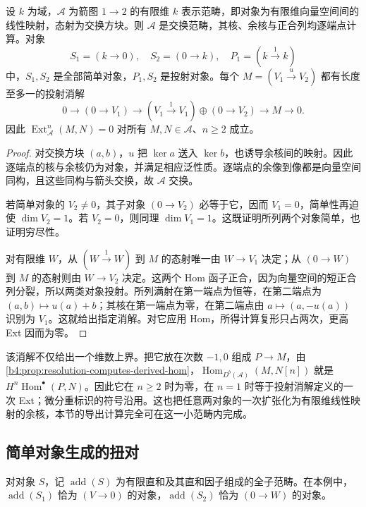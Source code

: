 \begin{proposition}\label{b4:prop:two-vertex-projective-resolution}
设 \(k\) 为域，\(\mathcal A\) 为箭图 \(1\to2\) 的有限维 \(k\) 表示范畴，即对象为有限维向量空间间的线性映射，态射为交换方块。则 \(\mathcal A\) 是交换范畴，其核、余核与正合列均逐端点计算。对象
\[
 S_1=(k\to0),\quad S_2=(0\to k),\quad P_1=(k\xrightarrow{1}k)
\]
中，\(S_1,S_2\) 是全部简单对象，\(P_1,S_2\) 是投射对象。每个 \(M=(V_1\xrightarrow{u}V_2)\) 都有长度至多一的投射消解
\[
 0\longrightarrow(0\to V_1)
 \longrightarrow(V_1\xrightarrow{1}V_1)\oplus(0\to V_2)
 \longrightarrow M\longrightarrow0.
\]
因此 \(\operatorname{Ext}_{\mathcal A}^n(M,N)=0\) 对所有 \(M,N\in\mathcal A\)、\(n\ge2\) 成立。
\end{proposition}
\begin{proof}
对交换方块 \((a,b)\)，\(u\) 把 \(\ker a\) 送入 \(\ker b\)，也诱导余核间的映射。因此逐端点的核与余核仍为对象，并满足相应泛性质。逐端点的余像到像都是向量空间同构，且这些同构与箭头交换，故 \(\mathcal A\) 交换。

若简单对象的 \(V_2\ne0\)，其子对象 \((0\to V_2)\) 必等于它，因而 \(V_1=0\)，简单性再迫使 \(\dim V_2=1\)。若 \(V_2=0\)，则同理 \(\dim V_1=1\)。这既证明所列两个对象简单，也证明穷尽性。

对有限维 \(W\)，从 \((W\xrightarrow{1}W)\) 到 \(M\) 的态射唯一由 \(W\to V_1\) 决定；从 \((0\to W)\) 到 \(M\) 的态射则由 \(W\to V_2\) 决定。这两个 Hom 函子正合，因为向量空间的短正合列分裂，所以两类对象投射。所列满射在第一端点为恒等，在第二端点为 \((a,b)\mapsto u(a)+b\)；其核在第一端点为零，在第二端点由 \(a\mapsto(a,-u(a))\) 识别为 \(V_1\)。这就给出指定消解。对它应用 Hom，所得计算复形只占两次，更高 Ext 因而为零。
\end{proof}

该消解不仅给出一个维数上界。把它放在次数 \(-1,0\) 组成 \(P\to M\)，由\cref{b4:prop:resolution-computes-derived-hom}，\(\operatorname{Hom}_{D^b(\mathcal A)}(M,N[n])\) 就是 \(H^n\operatorname{Hom}^{\bullet}(P,N)\)。因此它在 \(n\ge2\) 时为零，在 \(n=1\) 时等于投射消解定义的一次 Ext；微分重标识的符号沿用。这也把任意两对象的一次扩张化为有限维线性映射的余核，本节的导出计算完全可在这一小范畴内完成。

\subsection{简单对象生成的扭对}
\label{b4:subsec:1905:02}

对对象 \(S\)，记 \(\operatorname{add}(S)\) 为有限直和及其直和因子组成的全子范畴。在本例中，\(\operatorname{add}(S_1)\) 恰为 \((V\to0)\) 的对象，\(\operatorname{add}(S_2)\) 恰为 \((0\to W)\) 的对象。

